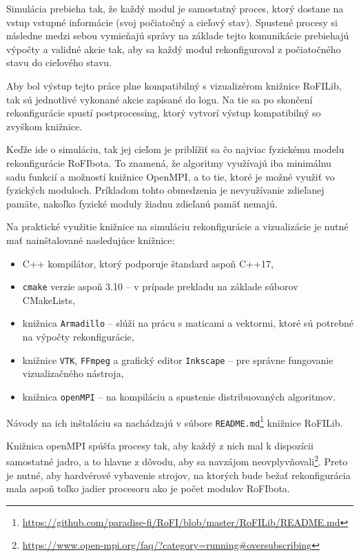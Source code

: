 \documentclass[
  digital, %
  oneside, %
  table,   %
  lof,     %
  nolot,     %
]{fithesis3}
\begin{document}
Simulácia prebieha tak, že každý modul je samostatný proces, ktorý dostane na vstup vstupné informácie (svoj počiatočný a cieľový stav). Spustené procesy si následne medzi sebou vymieňajú správy na základe tejto komunikácie prebiehajú výpočty a validné akcie tak, aby sa každý modul rekonfiguroval z počiatočného stavu do cieľového stavu. 

Aby bol výstup tejto práce plne kompatibilný s vizualizérom knižnice RoFILib, tak sú jednotlivé vykonané akcie zapísané do logu. Na tie sa po skončení rekonfigurácie spustí postprocessing, ktorý vytvorí výstup kompatibilný so zvyškom knižnice. 

Keďže ide o simuláciu, tak jej cieľom je priblížiť sa čo najviac fyzickému modelu rekonfigurácie RoFIbota. To znamená, že algoritmy využívajú iba minimálnu sadu funkcií a možností knižnice OpenMPI, a to tie, ktoré je možné využiť vo fyzických moduloch. Príkladom tohto obmedzenia je nevyužívanie zdieľanej pamäte, nakoľko fyzické moduly žiadnu zdieľanú pamäť nemajú. 

Na praktické využitie knižnice na simuláciu rekonfigurácie a vizualizácie je nutné mať nainštalované nasledujúce knižnice: 
\begin{itemize}
    \item C++ kompilátor, ktorý podporuje štandard aspoň C++17, 
    \item \texttt{cmake} verzie aspoň 3.10 -- v prípade prekladu na základe súborov CMakeLists, 
    \item knižnica \texttt{Armadillo} -- slúži na prácu s maticami a vektormi, ktoré sú potrebné na výpočty rekonfigurácie,  
    \item knižnice \texttt{VTK}, \texttt{FFmpeg} a grafický editor \texttt{Inkscape} -- pre správne fungovanie vizualizačného nástroja, 
    \item knižnica \texttt{openMPI} -- na kompiláciu a spustenie distribuovaných algoritmov. 
\end{itemize}

 Návody na ich inštaláciu sa nachádzajú v súbore \texttt{README.md}\footnote{\url{https://github.com/paradise-fi/RoFI/blob/master/RoFILib/README.md}} knižnice RoFILib. 

Knižnica openMPI spúšťa procesy tak, aby každý z nich mal k dispozícii samostatné jadro, a to hlavne z dôvodu, aby sa navzájom neovplyvňovali\footnote{\url{https://www.open-mpi.org/faq/?category=running#oversubscribing}}. Preto je nutné, aby hardvérové vybavenie strojov, na ktorých bude bežať rekonfigurácia mala aspoň toľko jadier procesoru ako je počet modulov RoFIbota. 
\end{document}

